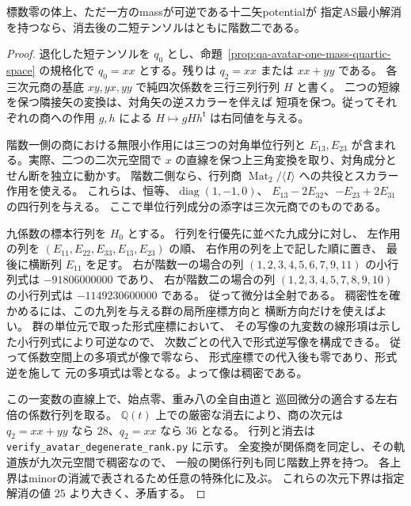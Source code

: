 \begin{theorem}[一mass層の短テンソルの非退化性]
\label{thm:qa-avatar-one-mass-forces-short-rank}
標数零の体上、ただ一方のmassが可逆である十二矢potentialが
指定AS最小解消を持つなら、消去後の二短テンソルはともに階数二である。
\end{theorem}
\begin{proof}
退化した短テンソルを $q_0$ とし、命題~\ref{prop:qa-avatar-one-mass-quartic-space}
の規格化で $q_0=xx$ とする。残りは $q_2=xx$ または $xx+yy$ である。
各三次元商の基底 $xy,yx,yy$ で純四次係数を三行三列行列 $H$ と書く。
二つの短線を保つ隣接矢の変換は、対角矢の逆スカラーを伴えば
短項を保つ。従ってそれぞれの商への作用 $g,h$ による
$H\mapsto gHh^{\mathsf t}$ は右同値を与える。

階数一側の商における無限小作用には三つの対角単位行列と
$E_{13},E_{23}$ が含まれる。実際、二つの二次元空間で
$x$ の直線を保つ上三角変換を取り、対角成分とせん断を独立に動かす。
階数二側なら、行列商 $\operatorname{Mat}_2/\langle I\rangle$
への共役とスカラー作用を使える。
これらは、恒等、$\operatorname{diag}(1,-1,0)$、
$E_{13}-2E_{32}$、$-E_{23}+2E_{31}$ の四行列を与える。
ここで単位行列成分の添字は三次元商でのものである。

九係数の標本行列を $H_0$ とする。
行列を行優先に並べた九成分に対し、
左作用の列を $(E_{11},E_{22},E_{33},E_{13},E_{23})$ の順、
右作用の列を上で記した順に置き、
最後に横断列 $E_{11}$ を足す。
右が階数一の場合の列 $(1,2,3,4,5,6,7,9,11)$ の小行列式は
$-91806000000$ であり、
右が階数二の場合の列 $(1,2,3,4,5,7,8,9,10)$ の小行列式は
$-1149230600000$ である。
従って微分は全射である。
稠密性を確かめるには、この九列を与える群の局所座標方向と
横断方向だけを使えばよい。
群の単位元で取った形式座標において、
その写像の九変数の線形項は示した小行列式により可逆なので、
次数ごとの代入で形式逆写像を構成できる。
従って係数空間上の多項式が像で零なら、
形式座標での代入後も零であり、形式逆を施して
元の多項式は零となる。よって像は稠密である。

この一変数の直線上で、始点零、重み八の全自由道と
巡回微分の適合する左右倍の係数行列を取る。
$\mathbb Q(t)$ 上での厳密な消去により、商の次元は
$q_2=xx+yy$ なら $28$、$q_2=xx$ なら $36$ となる。
行列と消去は
\texttt{verify\_avatar\_degenerate\_rank.py} に示す。
全変換が関係商を同定し、その軌道族が九次元空間で稠密なので、
一般の関係行列も同じ階数上界を持つ。
各上界はminorの消滅で表されるため任意の特殊化に及ぶ。
これらの次元下界は指定解消の値 $25$ より大きく、矛盾する。
\end{proof}

